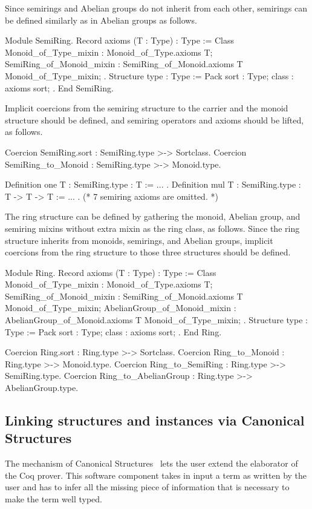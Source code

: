 \documentclass[a4paper,UKenglish,cleveref, autoref]{lipics-v2019}
\newcommand{\mixin}{mixin}
\newcommand{\mixins}{mixins}
\theoremstyle{implem}
\theoremstyle{implem}
\theoremstyle{command}
\begin{document}
Since semirings and Abelian groups do not inherit from each other, semirings can
be defined similarly as in Abelian groups as follows.
\begin{coqcode}
Module SemiRing.
Record axioms (T : Type) : Type := Class {
  Monoid_of_Type_mixin : Monoid_of_Type.axioms T;
  SemiRing_of_Monoid_mixin : SemiRing_of_Monoid.axioms T Monoid_of_Type_mixin; }.
Structure type : Type := Pack { sort : Type; class : axioms sort; }.
End SemiRing.
\end{coqcode}
Implicit coercions from the semiring structure to the carrier and the monoid structure should be defined, and semiring operators and axioms should be lifted, as follows.
\begin{coqcode}
Coercion SemiRing.sort : SemiRing.type >-> Sortclass.
Coercion SemiRing_to_Monoid : SemiRing.type >-> Monoid.type.

Definition one {T : SemiRing.type} : T := ... .
Definition mul {T : SemiRing.type} : T -> T -> T := ... .
(* 7 semiring axioms are omitted. *)
\end{coqcode}

The ring structure can be defined by gathering the monoid, Abelian group, and semiring \mixins{} without extra \mixin{} as the ring class, as follows.
Since the ring structure inherits from monoids, semirings, and Abelian groups, implicit coercions from the ring structure to those three structures should be defined.
\begin{coqcode}
Module Ring.
Record axioms (T : Type) : Type := Class {
  Monoid_of_Type_mixin : Monoid_of_Type.axioms T;
  SemiRing_of_Monoid_mixin : SemiRing_of_Monoid.axioms T Monoid_of_Type_mixin;
  AbelianGroup_of_Monoid_mixin : AbelianGroup_of_Monoid.axioms T Monoid_of_Type_mixin; }.
Structure type : Type := Pack { sort : Type; class : axioms sort; }.
End Ring.

Coercion Ring.sort : Ring.type >-> Sortclass.
Coercion Ring_to_Monoid : Ring.type >-> Monoid.type.
Coercion Ring_to_SemiRing : Ring.type >-> SemiRing.type.
Coercion Ring_to_AbelianGroup : Ring.type >-> AbelianGroup.type.
\end{coqcode}

\subsection{Linking structures and instances via Canonical Structures}

The mechanism of Canonical Structures~\cite{DBLP:conf/itp/MahboubiT13,Saibi99phd}
lets the user extend the elaborator of the Coq prover. This software component
takes in input a term as written by the user and has to infer all the missing
piece of information that is necessary to make the term well typed.
\end{document}

